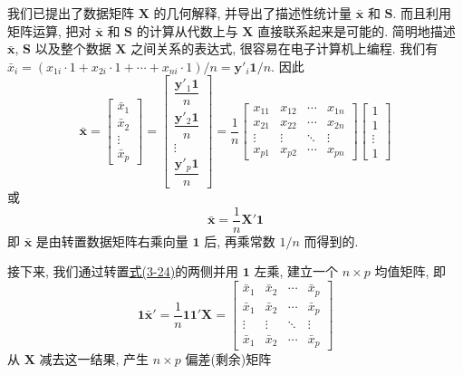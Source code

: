 我们已提出了数据矩阵 $\mathbf{X}$ 的几何解释, 并导出了描述性统计量 $\bar{\mathbf{x}}$ 和 $\mathbf{S}$. 而且利用矩阵运算, 把对 $\bar{\mathbf{x}}$ 和 $\mathbf{S}$ 的计算从代数上与 $\mathbf{X}$ 直接联系起来是可能的. 简明地描述 $\bar{\mathbf{x}}$, $\mathbf{S}$ 以及整个数据 $\mathbf{X}$ 之间关系的表达式, 很容易在电子计算机上编程. 我们有 $\bar{x}_{i}=(x_{1i}\cdot1+x_{2i}\cdot1+\cdots+x_{ni}\cdot1)/n=\mathbf{y}'_{i}\mathbf{1}/n$. 因此
\[
\bar{\mathbf{x}}=\begin{bmatrix}\bar{x}_{1}\\\bar{x}_{2}\\\vdots\\\bar{x}_{p}\end{bmatrix}=\begin{bmatrix}\dfrac{\mathbf{y}'_{1}\mathbf{1}}{n}\\\dfrac{\mathbf{y}'_{2}\mathbf{1}}{n}\\\vdots\\\dfrac{\mathbf{y}'_{p}\mathbf{1}}{n}\end{bmatrix}=\frac{1}{n}\begin{bmatrix}x_{11}&x_{12}&\cdots&x_{1n}\\x_{21}&x_{22}&\cdots&x_{2n}\\\vdots&\vdots&\ddots&\vdots\\x_{p1}&x_{p2}&\cdots&x_{pn}\end{bmatrix}\begin{bmatrix}1\\1\\\vdots\\1\end{bmatrix}
\]
或
\label{eq:3-24}
\begin{equation}
\bar{\mathbf{x}}=\frac{1}{n}\mathbf{X}'\mathbf{1} \tag{3-24}
\end{equation}
即 $\bar{\mathbf{x}}$ 是由转置数据矩阵右乘向量 $\mathbf{1}$ 后, 再乘常数 $1/n$ 而得到的.

接下来, 我们通过转置\hyperref[eq:3-24]{式(3-24)}的两侧并用 $\mathbf{1}$ 左乘, 建立一个 $n\times p$ 均值矩阵, 即
\label{eq:3-25}
\begin{equation}
\mathbf{1}\bar{\mathbf{x}}'=\frac{1}{n}\mathbf{1}\mathbf{1}'\mathbf{X}=\begin{bmatrix}\bar{x}_{1}&\bar{x}_{2}&\cdots&\bar{x}_{p}\\\bar{x}_{1}&\bar{x}_{2}&\cdots&\bar{x}_{p}\\\vdots&\vdots&\ddots&\vdots\\\bar{x}_{1}&\bar{x}_{2}&\cdots&\bar{x}_{p}\end{bmatrix} \tag{3-25}
\end{equation}
从 $\mathbf{X}$ 减去这一结果, 产生 $n\times p$ 偏差(剩余)矩阵
